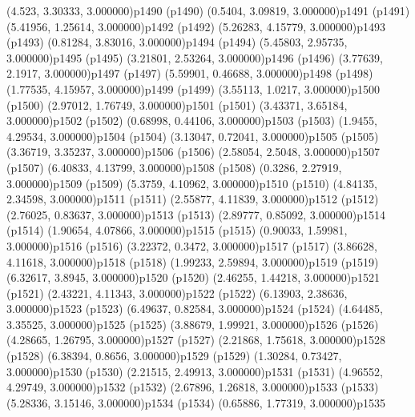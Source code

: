 \psPoint(4.523, 3.30333, 3.000000){p1490}
\psdot(p1490)
\psPoint(0.5404, 3.09819, 3.000000){p1491}
\psdot(p1491)
\psPoint(5.41956, 1.25614, 3.000000){p1492}
\psdot(p1492)
\psPoint(5.26283, 4.15779, 3.000000){p1493}
\psdot(p1493)
\psPoint(0.81284, 3.83016, 3.000000){p1494}
\psdot(p1494)
\psPoint(5.45803, 2.95735, 3.000000){p1495}
\psdot(p1495)
\psPoint(3.21801, 2.53264, 3.000000){p1496}
\psdot(p1496)
\psPoint(3.77639, 2.1917, 3.000000){p1497}
\psdot(p1497)
\psPoint(5.59901, 0.46688, 3.000000){p1498}
\psdot(p1498)
\psPoint(1.77535, 4.15957, 3.000000){p1499}
\psdot(p1499)
\psPoint(3.55113, 1.0217, 3.000000){p1500}
\psdot(p1500)
\psPoint(2.97012, 1.76749, 3.000000){p1501}
\psdot(p1501)
\psPoint(3.43371, 3.65184, 3.000000){p1502}
\psdot(p1502)
\psPoint(0.68998, 0.44106, 3.000000){p1503}
\psdot(p1503)
\psPoint(1.9455, 4.29534, 3.000000){p1504}
\psdot(p1504)
\psPoint(3.13047, 0.72041, 3.000000){p1505}
\psdot(p1505)
\psPoint(3.36719, 3.35237, 3.000000){p1506}
\psdot(p1506)
\psPoint(2.58054, 2.5048, 3.000000){p1507}
\psdot(p1507)
\psPoint(6.40833, 4.13799, 3.000000){p1508}
\psdot(p1508)
\psPoint(0.3286, 2.27919, 3.000000){p1509}
\psdot(p1509)
\psPoint(5.3759, 4.10962, 3.000000){p1510}
\psdot(p1510)
\psPoint(4.84135, 2.34598, 3.000000){p1511}
\psdot(p1511)
\psPoint(2.55877, 4.11839, 3.000000){p1512}
\psdot(p1512)
\psPoint(2.76025, 0.83637, 3.000000){p1513}
\psdot(p1513)
\psPoint(2.89777, 0.85092, 3.000000){p1514}
\psdot(p1514)
\psPoint(1.90654, 4.07866, 3.000000){p1515}
\psdot(p1515)
\psPoint(0.90033, 1.59981, 3.000000){p1516}
\psdot(p1516)
\psPoint(3.22372, 0.3472, 3.000000){p1517}
\psdot(p1517)
\psPoint(3.86628, 4.11618, 3.000000){p1518}
\psdot(p1518)
\psPoint(1.99233, 2.59894, 3.000000){p1519}
\psdot(p1519)
\psPoint(6.32617, 3.8945, 3.000000){p1520}
\psdot(p1520)
\psPoint(2.46255, 1.44218, 3.000000){p1521}
\psdot(p1521)
\psPoint(2.43221, 4.11343, 3.000000){p1522}
\psdot(p1522)
\psPoint(6.13903, 2.38636, 3.000000){p1523}
\psdot(p1523)
\psPoint(6.49637, 0.82584, 3.000000){p1524}
\psdot(p1524)
\psPoint(4.64485, 3.35525, 3.000000){p1525}
\psdot(p1525)
\psPoint(3.88679, 1.99921, 3.000000){p1526}
\psdot(p1526)
\psPoint(4.28665, 1.26795, 3.000000){p1527}
\psdot(p1527)
\psPoint(2.21868, 1.75618, 3.000000){p1528}
\psdot(p1528)
\psPoint(6.38394, 0.8656, 3.000000){p1529}
\psdot(p1529)
\psPoint(1.30284, 0.73427, 3.000000){p1530}
\psdot(p1530)
\psPoint(2.21515, 2.49913, 3.000000){p1531}
\psdot(p1531)
\psPoint(4.96552, 4.29749, 3.000000){p1532}
\psdot(p1532)
\psPoint(2.67896, 1.26818, 3.000000){p1533}
\psdot(p1533)
\psPoint(5.28336, 3.15146, 3.000000){p1534}
\psdot(p1534)
\psPoint(0.65886, 1.77319, 3.000000){p1535}
